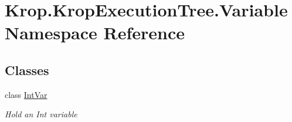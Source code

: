 \hypertarget{namespace_krop_1_1_krop_execution_tree_1_1_variable}{}\section{Krop.\+Krop\+Execution\+Tree.\+Variable Namespace Reference}
\label{namespace_krop_1_1_krop_execution_tree_1_1_variable}
\subsection*{Classes}
\begin{DoxyCompactItemize}
\item 
class \mbox{\hyperlink{class_krop_1_1_krop_execution_tree_1_1_variable_1_1_int_var}{Int\+Var}}
\begin{DoxyCompactList}\small\item\em Hold an Int variable \end{DoxyCompactList}\end{DoxyCompactItemize}
